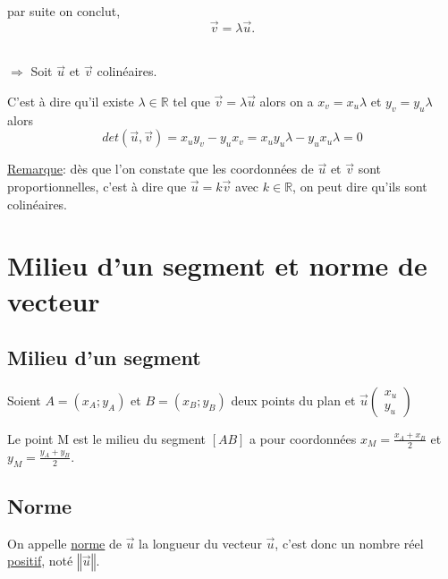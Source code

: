 \documentclass[french]{book}
\newcommand{\norme}[1]{\left\Vert #1\right\Vert}
\begin{document}
\begin{demo}
\begin{itemize}
par suite on conclut, $$\overrightarrow{v}= \lambda \overrightarrow{u}.$$ \\

\end{itemize}

$\Longrightarrow$ Soit $\overrightarrow{u}$ et $\overrightarrow{v}$ colinéaires. 

C'est à dire qu'il existe $\lambda \in \mathbb{R}$ tel que $\overrightarrow{v}=\lambda \overrightarrow{u}$ alors on a $x_v=x_u \lambda$ et $y_v= y_u \lambda$ alors $$det(\overrightarrow{u}, \overrightarrow{v})=x_u y_v - y_u x_v = x_u y_u \lambda - y_u x_u \lambda = 0$$



\end{demo}

\underline{Remarque}: dès que l’on constate que les coordonnées de $\overrightarrow{u}$ et $\overrightarrow{v}$ sont proportionnelles, c'est à dire que $\overrightarrow{u}=k \overrightarrow{v}$ avec $k \in \mathbb{R}$, on peut dire qu’ils sont colinéaires.

\newpage

\section{Milieu d’un segment et norme de vecteur}

\subsection{Milieu d’un segment}
Soient $A=(x_A;y_A)$ et $B=(x_B;y_B)$ deux points du plan et $\overrightarrow{u}\left( \begin{array}{c}
x_u \\
y_u 
\end{array} \right)$

\begin{prop}
Le point M est le milieu du segment $[AB]$ a pour coordonnées $x_M=\frac{x_A+x_B}{2}$ et  $y_M=\frac{y_A+y_B}{2}$.
\end{prop}

\subsection{Norme}

\begin{defn}

On appelle \underline{norme} de $\overrightarrow{u}$ la longueur du vecteur $\overrightarrow{u}$, c’est donc un nombre réel \underline{positif}, noté $\norme{\overrightarrow{u}}$.
\vspace{4mm}

\end{defn}
\end{document}
